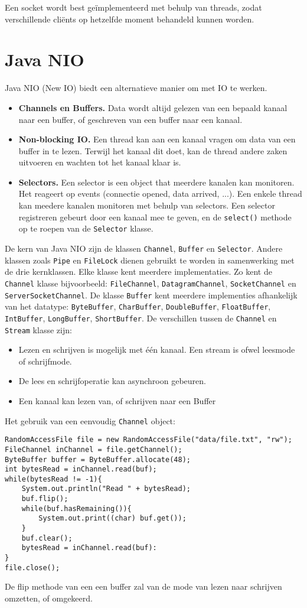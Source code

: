 \documentclass{report}
\begin{document}
Een socket wordt best geïmplementeerd met behulp van threads, zodat verschillende cliënts op hetzelfde moment behandeld kunnen worden.

\chapter{Java NIO}
Java NIO (New IO) biedt een alternatieve manier om met IO te werken.
\begin{itemize}
    \item \textbf{Channels en Buffers.} Data wordt altijd gelezen van een bepaald kanaal naar een buffer, of geschreven van een buffer naar een kanaal.
    \item \textbf{Non-blocking IO.} Een thread kan aan een kanaal vragen om data van een buffer in te lezen. Terwijl het kanaal dit doet, kan de thread andere zaken uitvoeren en wachten tot het kanaal klaar is.
    \item \textbf{Selectors.} Een selector is een object that meerdere kanalen kan monitoren. Het reageert op events (connectie opened, data arrived, ...). Een enkele thread kan meedere kanalen monitoren met behulp van selectors. Een selector registreren gebeurt door een kanaal mee te geven, en de \texttt{select()} methode op te roepen van de \texttt{Selector} klasse.
\end{itemize}
De kern van Java NIO zijn de klassen \texttt{Channel}, \texttt{Buffer} en \texttt{Selector}. Andere klassen zoals \texttt{Pipe} en \texttt{FileLock} dienen gebruikt te worden in samenwerking met de drie kernklassen. Elke klasse kent meerdere implementaties. Zo kent de \texttt{Channel} klasse bijvoorbeeld: \texttt{FileChannel}, \texttt{DatagramChannel}, \texttt{SocketChannel} en \texttt{ServerSocketChannel}. De klasse \texttt{Buffer} kent meerdere implementies afhankelijk van het datatype: \texttt{ByteBuffer}, \texttt{CharBuffer}, \texttt{DoubleBuffer}, \texttt{FloatBuffer}, \texttt{IntBuffer}, \texttt{LongBuffer}, \texttt{ShortBuffer}. 
De verschillen tussen de \texttt{Channel} en \texttt{Stream} klasse zijn:
\begin{itemize}
    \item Lezen en schrijven is mogelijk met één kanaal. Een stream is ofwel leesmode of schrijfmode.
    \item De lees en schrijfoperatie kan asynchroon gebeuren.
    \item Een kanaal kan lezen van, of schrijven naar een Buffer
\end{itemize}
Het gebruik van een eenvoudig \texttt{Channel} object:
\begin{lstlisting}
RandomAccessFile file = new RandomAccessFile("data/file.txt", "rw");
FileChannel inChannel = file.getChannel();
ByteBuffer buffer = ByteBuffer.allocate(48);
int bytesRead = inChannel.read(buf);
while(bytesRead != -1){
    System.out.println("Read " + bytesRead);
    buf.flip();
    while(buf.hasRemaining()){
        System.out.print((char) buf.get());
    }
    buf.clear();
    bytesRead = inChannel.read(buf):
}
file.close();
\end{lstlisting}
De flip methode van een een buffer zal van de mode van lezen naar schrijven omzetten, of omgekeerd.
\end{document}
